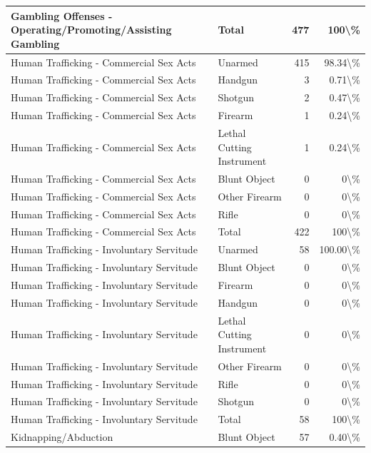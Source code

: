 \documentclass[
]{krantz}
\begin{document}
\begin{longtable}[t]{l|l|r|r}
\hline
Gambling Offenses - Operating/Promoting/Assisting Gambling & Total & 477 & 100\textbackslash{}\%\\
\hline
Human Trafficking - Commercial Sex Acts & Unarmed & 415 & 98.34\textbackslash{}\%\\
\hline
Human Trafficking - Commercial Sex Acts & Handgun & 3 & 0.71\textbackslash{}\%\\
\hline
Human Trafficking - Commercial Sex Acts & Shotgun & 2 & 0.47\textbackslash{}\%\\
\hline
Human Trafficking - Commercial Sex Acts & Firearm & 1 & 0.24\textbackslash{}\%\\
\hline
Human Trafficking - Commercial Sex Acts & Lethal Cutting Instrument & 1 & 0.24\textbackslash{}\%\\
\hline
Human Trafficking - Commercial Sex Acts & Blunt Object & 0 & 0\textbackslash{}\%\\
\hline
Human Trafficking - Commercial Sex Acts & Other Firearm & 0 & 0\textbackslash{}\%\\
\hline
Human Trafficking - Commercial Sex Acts & Rifle & 0 & 0\textbackslash{}\%\\
\hline
Human Trafficking - Commercial Sex Acts & Total & 422 & 100\textbackslash{}\%\\
\hline
Human Trafficking - Involuntary Servitude & Unarmed & 58 & 100.00\textbackslash{}\%\\
\hline
Human Trafficking - Involuntary Servitude & Blunt Object & 0 & 0\textbackslash{}\%\\
\hline
Human Trafficking - Involuntary Servitude & Firearm & 0 & 0\textbackslash{}\%\\
\hline
Human Trafficking - Involuntary Servitude & Handgun & 0 & 0\textbackslash{}\%\\
\hline
Human Trafficking - Involuntary Servitude & Lethal Cutting Instrument & 0 & 0\textbackslash{}\%\\
\hline
Human Trafficking - Involuntary Servitude & Other Firearm & 0 & 0\textbackslash{}\%\\
\hline
Human Trafficking - Involuntary Servitude & Rifle & 0 & 0\textbackslash{}\%\\
\hline
Human Trafficking - Involuntary Servitude & Shotgun & 0 & 0\textbackslash{}\%\\
\hline
Human Trafficking - Involuntary Servitude & Total & 58 & 100\textbackslash{}\%\\
\hline
Kidnapping/Abduction & Blunt Object & 57 & 0.40\textbackslash{}\%\\

\end{longtable}
\end{document}

